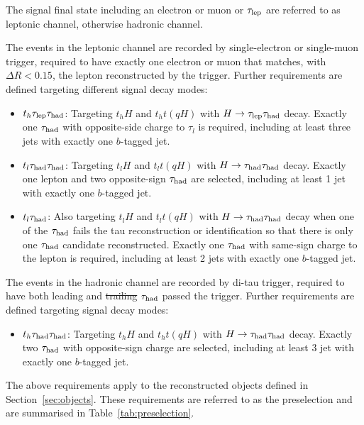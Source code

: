 \documentclass[PAPER, coverpage, atlasdraft=true, texlive=2016, UKenglish]{\ATLASLATEXPATH atlasdoc}
\providecommand{\DIFadd}[1]{{\protect\color{blue}\uwave{#1}}} %
\providecommand{\DIFdel}[1]{{\protect\color{red}\sout{#1}}}                      %
\providecommand{\DIFaddbegin}{} %
\providecommand{\DIFaddend}{} %
\providecommand{\DIFdelbegin}{} %
\providecommand{\DIFdelend}{} %
\begin{document}
The signal final state including an electron or muon or $\tau_{\mathrm{lep}}$ are referred to as leptonic channel, otherwise hadronic channel.
\DIFdelbegin %

\DIFdelend The events in the leptonic channel are recorded by single-electron or single-muon trigger, required to have exactly one electron or muon that matches, with $\Delta R < 0.15$, the lepton reconstructed by the trigger. Further requirements are defined targeting different signal decay modes:  
\begin{itemize}
\item $t_h\tau_{\mathrm{lep}} \tau_{\mathrm{had}}$: Targeting $t_hH$ and $t_ht(qH)$ with $H\to\tau_{\mathrm{lep}} \tau_{\mathrm{had}}$ decay. Exactly one $\tau_{\mathrm{had}}$ with opposite-side charge to $\tau_l$ is required, including at least three jets with exactly one $b$-tagged jet.
\item $t_l\tau_{\mathrm{had}} \tau_{\mathrm{had}}$: Targeting $t_lH$ and $t_lt(qH)$ with $H\to\tau_{\mathrm{had}} \tau_{\mathrm{had}}$ decay. Exactly one lepton and two opposite-sign $\tau_{\mathrm{had}}$ are selected, including at least 1 jet with exactly one $b$-tagged jet.
\item $t_l\tau_{\mathrm{had}}$: Also targeting $t_lH$ and $t_lt(qH)$ with $H\to\tau_{\mathrm{had}} \tau_{\mathrm{had}}$ decay when one of the $\tau_{\mathrm{had}}$ fails the tau reconstruction or identification so that there is only
  one $\tau_{\mathrm{had}}$ candidate reconstructed. Exactly one $\tau_{\mathrm{had}}$ with same-sign charge to the lepton is required, including at least 2 jets with exactly one $b$-tagged jet.
\end{itemize}

The events in the hadronic channel are recorded by di-tau trigger, required to have both leading and \DIFdelbegin \DIFdel{trailing }\DIFdelend \DIFaddbegin \DIFadd{subleading }\DIFaddend $\tau_{\mathrm{had}}$ passed the trigger. Further requirements are defined targeting signal decay modes:
\begin{itemize}
\item $t_h\tau_{\mathrm{had}} \tau_{\mathrm{had}}$: Targeting $t_hH$ and $t_ht(qH)$ with $H\to\tau_{\mathrm{had}} \tau_{\mathrm{had}}$ decay. Exactly two $\tau_{\mathrm{had}}$ with opposite-sign charge are selected, including at least 3 jet with exactly one $b$-tagged jet.
\end{itemize}

The above requirements apply to the reconstructed objects defined in Section~\ref{sec:objects}.
These requirements are referred to as the preselection and are summarised in Table~\ref{tab:preselection}. 
\end{document}
